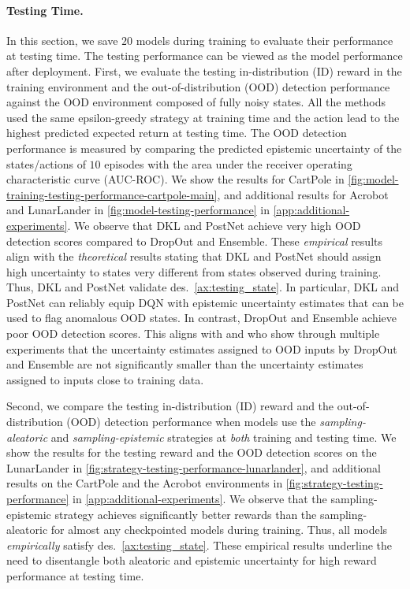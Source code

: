 
\paragraph{Testing Time.} In this section, we save $20$ models during training to evaluate their performance at testing time. The testing performance can be viewed as the model performance after deployment. First, we evaluate the testing in-distribution (ID) reward in the training environment and the out-of-distribution (OOD) detection performance against the OOD environment composed of fully noisy states. All the methods used the same epsilon-greedy strategy at training time and the action lead to the highest predicted expected return at testing time. The OOD detection performance is measured by comparing the predicted epistemic uncertainty of the states/actions of $10$ episodes with the area under the receiver operating characteristic curve (AUC-ROC). We show the results for CartPole in \cref{fig:model-training-testing-performance-cartpole-main}, and additional results for Acrobot and LunarLander in \cref{fig:model-testing-performance} in \cref{app:additional-experiments}. We observe that DKL and PostNet achieve very high OOD detection scores compared to DropOut and Ensemble. These \emph{empirical} results align with the \emph{theoretical} results stating that DKL and PostNet should assign high uncertainty to states very different from states observed during training. Thus, DKL and PostNet validate des.~\ref{ax:testing_state}. In particular, DKL and PostNet can reliably equip DQN with epistemic uncertainty estimates that can be used to flag anomalous OOD states. In contrast, DropOut and Ensemble achieve poor OOD detection scores. This aligns with \citet{randomized-prior-functions} and \citet{natpn} who show through multiple experiments that the uncertainty estimates assigned to OOD inputs by DropOut and Ensemble are not significantly smaller than the uncertainty estimates assigned to inputs close to training data.

%
%
%

Second, we compare the testing in-distribution (ID) reward and the out-of-distribution (OOD) detection performance when models use the \emph{sampling-aleatoric} and \emph{sampling-epistemic} strategies at \emph{both} training and testing time. We show the results for the testing reward and the OOD detection scores on the LunarLander in \cref{fig:strategy-testing-performance-lunarlander}, and additional results on the CartPole and the Acrobot environments in \cref{fig:strategy-testing-performance} in \cref{app:additional-experiments}. We observe that the sampling-epistemic strategy achieves significantly better rewards than the sampling-aleatoric for almost any checkpointed models during training. Thus, all models \emph{empirically} satisfy des.~\ref{ax:testing_state}. These empirical results underline the need to disentangle both aleatoric and epistemic uncertainty for high reward performance at testing time.


